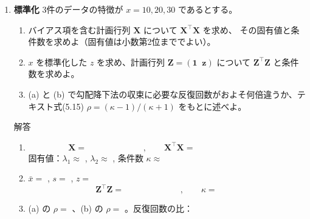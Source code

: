 \documentclass[a4paper,dvipdfmx]{jsarticle}
\newcommand{\提出期限}{2026年10月26日（月）}
\newcommand{\学籍番号}{0000000}
\newcommand{\氏名}{氏名を書く}
\newcommand{\提出日}{2026年10月26日}
\newenvironment{answer}{\begin{itembox}[l]{解答}}{\end{itembox}}
\begin{document}
\begin{enumerate}
  \item \textbf{標準化}\quad
    3件のデータの特徴が $x = 10, 20, 30$ であるとする。
    \begin{enumerate}
      \item バイアス項を含む計画行列 $\bm{X}$ について $\bm{X}^\top\bm{X}$ を求め、
        その固有値と条件数を求めよ（固有値は小数第2位まででよい）。
      \item $x$ を標準化した $z$ を求め、計画行列 $\bm{Z} = (\bm{1}\;\; \bm{z})$ について $\bm{Z}^\top\bm{Z}$ と条件数を求めよ。
      \item (a) と (b) で勾配降下法の収束に必要な反復回数がおよそ何倍違うか、テキスト式(5.15)
        $\rho = (\kappa - 1)/(\kappa + 1)$ をもとに述べよ。
    \end{enumerate}
    \begin{answer}
      \begin{enumerate}
        \item
          \begin{equation*}
            \bm{X} = \phantom{XXXXXXXX}, \qquad \bm{X}^\top\bm{X} = \phantom{XXXXXXXXXX}
          \end{equation*}
          固有値：$\lambda_1 \approx $ \phantom{XXXXX}, \quad $\lambda_2 \approx $ \phantom{XXXXX}, \quad
          条件数 $\kappa \approx $ \phantom{XXXXX}
        \item $\bar{x} = $ \phantom{XX}, \quad $s = $ \phantom{XXXXX}, \quad $z = $ \phantom{XXXXXXXXXX}
          \begin{equation*}
            \bm{Z}^\top\bm{Z} = \phantom{XXXXXXXX}, \qquad \kappa = \phantom{XXX}
          \end{equation*}
        \item (a) の $\rho = $ \phantom{XXXXX}、(b) の $\rho = $ \phantom{XXX}。反復回数の比：
          \vspace{12mm}
      \end{enumerate}
    \end{answer}


\end{enumerate}
\end{document}
